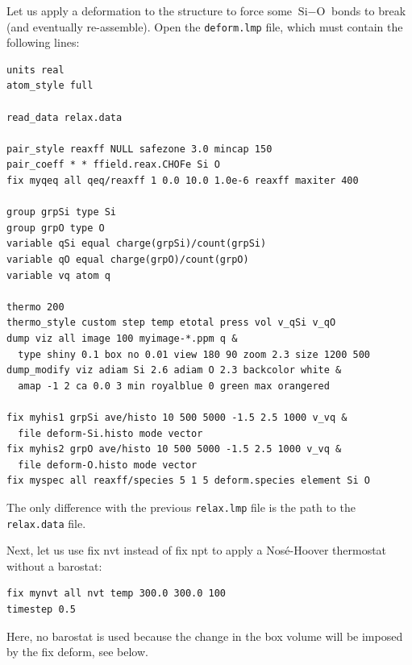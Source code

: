 \documentclass[9pt,tutorial]{livecoms}
\newcommand{\lmpcmd}[1]{\colorbox{listing}{\textcolor{command}{\small{#1}}}} %
\newcommand{\flecmd}[1]{\textcolor{command}{\texttt{#1}}} %
\begin{document}
Let us apply a deformation to the structure to force some $\text{Si}-\text{O}$
bonds to break (and eventually re-assemble).  Open the \flecmd{deform.lmp}
file, which must contain the following lines:
\begin{lstlisting}
units real
atom_style full

read_data relax.data

pair_style reaxff NULL safezone 3.0 mincap 150
pair_coeff * * ffield.reax.CHOFe Si O
fix myqeq all qeq/reaxff 1 0.0 10.0 1.0e-6 reaxff maxiter 400

group grpSi type Si
group grpO type O
variable qSi equal charge(grpSi)/count(grpSi)
variable qO equal charge(grpO)/count(grpO)
variable vq atom q

thermo 200
thermo_style custom step temp etotal press vol v_qSi v_qO
dump viz all image 100 myimage-*.ppm q &
  type shiny 0.1 box no 0.01 view 180 90 zoom 2.3 size 1200 500
dump_modify viz adiam Si 2.6 adiam O 2.3 backcolor white &
  amap -1 2 ca 0.0 3 min royalblue 0 green max orangered

fix myhis1 grpSi ave/histo 10 500 5000 -1.5 2.5 1000 v_vq &
  file deform-Si.histo mode vector
fix myhis2 grpO ave/histo 10 500 5000 -1.5 2.5 1000 v_vq &
  file deform-O.histo mode vector
fix myspec all reaxff/species 5 1 5 deform.species element Si O
\end{lstlisting}
The only difference with the previous \flecmd{relax.lmp} file is the path to
the \flecmd{relax.data} file.

Next, let us use \lmpcmd{fix nvt} instead of \lmpcmd{fix npt} to apply a
Nosé-Hoover thermostat without a barostat:
\begin{lstlisting}
fix mynvt all nvt temp 300.0 300.0 100
timestep 0.5
\end{lstlisting}
Here, no barostat is used because the change in the box volume will be imposed
by the \lmpcmd{fix deform}, see below.
\end{document}
